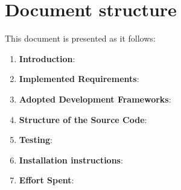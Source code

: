 \section{Document structure}
This document is presented as it follows:
\begin{enumerate}
	\item \textbf{Introduction}: 

	\item \textbf{Implemented Requirements}: 

	\item \textbf{Adopted Development Frameworks}: 

	\item \textbf{Structure of the Source Code}: 

    \item \textbf{Testing}: 
    
    \item \textbf{Installation instructions}: 

	\item \textbf{Effort Spent}: 
\end{enumerate}
